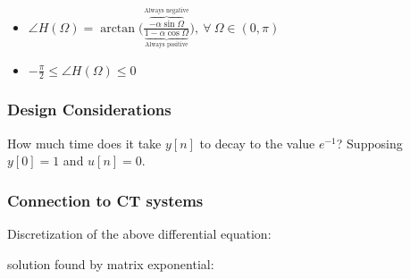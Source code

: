 \documentclass[8pt,a4paper]{scrartcl}
\begin{document}
\begin{multicols*}{3}
{\begin{itemize}
$\frac{d|H(\Omega)|}{d\Omega}\leq 0,\ \forall\ \Omega\in(0,\pi)$
\item $\angle H(\Omega)=\arctan\bigg(\frac{\overbrace{-\alpha\sin\Omega}^{\text{Always negative}}}{\underbrace{1-\alpha\cos\Omega}_{\text{Always positive}}}\bigg),\ \forall\ \Omega\in(0,\pi)$
\item $-\frac{\pi}{2}\leq\angle H(\Omega)\leq 0$
\end{itemize}
}

\subsubsection{Design Considerations}

How much time does it take $y[n]$ to decay to the value $e^{-1}$? Supposing $y[0]=1$ and $u[n]=0$.




\subsubsection{Connection to CT systems}



Discretization of the above differential equation:


solution found by matrix exponential:


\end{multicols*}
\end{document}
